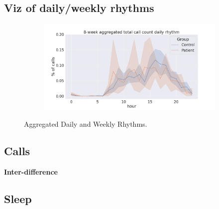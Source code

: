 \documentclass[journal, onecolumn, 11pt]{IEEEtran}
\begin{document}
\subsection{Viz of daily/weekly rhythms}

\begin{figure}[hpt]
  \centering
  \begin{subfigure}[b]{0.75\textwidth}
    \includegraphics[width=\textwidth]{pilot_figs/agg_total_call_rhythm.png}
  \end{subfigure}

  \caption{Aggregated Daily and Weekly Rhythms.}
\end{figure}

\subsection{Calls}

\textbf{Inter-difference}

\subsection{Sleep}
\end{document}
